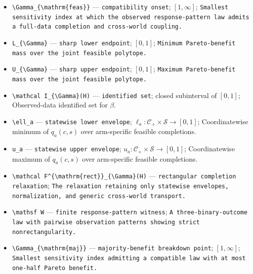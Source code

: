 \documentclass{article}
\begin{document}
\begin{itemize}
  \item \texttt{\textbackslash{}\allowbreak{}Gamma\_\allowbreak{}\{\textbackslash{}\allowbreak{}mathrm\{feas\}\allowbreak{}\}\allowbreak{}} --- \texttt{compatibility onset}; \([1,\infty]\); \texttt{Smallest sensitivity index at which the observed response-\allowbreak{}pattern law admits a full-\allowbreak{}data completion and cross-\allowbreak{}world coupling.}
  \item \texttt{L\_\allowbreak{}\{\textbackslash{}\allowbreak{}Gamma\}\allowbreak{}} --- \texttt{sharp lower endpoint}; \([0,1]\); \texttt{Minimum Pareto-\allowbreak{}benefit mass over the joint feasible polytope.}
  \item \texttt{U\_\allowbreak{}\{\textbackslash{}\allowbreak{}Gamma\}\allowbreak{}} --- \texttt{sharp upper endpoint}; \([0,1]\); \texttt{Maximum Pareto-\allowbreak{}benefit mass over the joint feasible polytope.}
  \item \texttt{\textbackslash{}\allowbreak{}mathcal I\_\allowbreak{}\{\textbackslash{}\allowbreak{}Gamma\}\allowbreak{}(H)} --- \texttt{identified set}; closed subinterval of \([0,1]\); Observed-data identified set for \(\beta\).
  \item \texttt{\textbackslash{}\allowbreak{}ell\_\allowbreak{}a} --- \texttt{statewise lower envelope}; \(\ell_a:\mathcal C_{+}\times\mathcal S\to[0,1]\); Coordinatewise minimum of \(q_a(c,s)\) over arm-specific feasible completions.
  \item \texttt{u\_\allowbreak{}a} --- \texttt{statewise upper envelope}; \(u_a:\mathcal C_{+}\times\mathcal S\to[0,1]\); Coordinatewise maximum of \(q_a(c,s)\) over arm-specific feasible completions.
  \item \texttt{\textbackslash{}\allowbreak{}mathcal F\textasciicircum{}\{\textbackslash{}\allowbreak{}mathrm\{rect\}\allowbreak{}\}\allowbreak{}\_\allowbreak{}\{\textbackslash{}\allowbreak{}Gamma\}\allowbreak{}(H)} --- \texttt{rectangular completion relaxation}; \texttt{The relaxation retaining only statewise envelopes,\allowbreak{} normalization,\allowbreak{} and generic cross-\allowbreak{}world transport.}
  \item \texttt{\textbackslash{}\allowbreak{}mathsf W} --- \texttt{finite response-\allowbreak{}pattern witness}; \texttt{A three-\allowbreak{}binary-\allowbreak{}outcome law with pairwise observation patterns showing strict nonrectangularity.}
  \item \texttt{\textbackslash{}\allowbreak{}Gamma\_\allowbreak{}\{\textbackslash{}\allowbreak{}mathrm\{maj\}\allowbreak{}\}\allowbreak{}} --- \texttt{majority-\allowbreak{}benefit breakdown point}; \([1,\infty]\); \texttt{Smallest sensitivity index admitting a compatible law with at most one-\allowbreak{}half Pareto benefit.}

\end{itemize}
\end{document}
